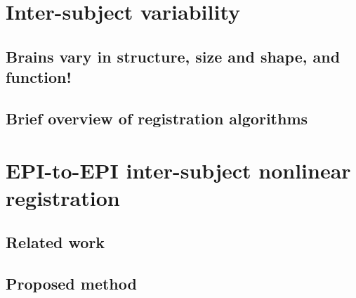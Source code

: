 

\chapter{Inter-subject variability}
\section{Brains vary in structure, size and shape, and function!}
\section{Brief overview of registration algorithms}

\chapter{EPI-to-EPI inter-subject nonlinear registration}\label{Chapter_1_Section_1}
\section{Related work}
\section{Proposed method}


